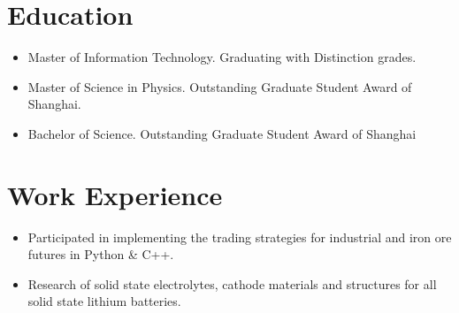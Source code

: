 \documentclass{resume}
\begin{document}
  

\section{Education}
\begin{itemize}
\item Master of Information Technology. Graduating with Distinction grades.
\end{itemize}

\begin{itemize}
\item  Master of Science in Physics. Outstanding Graduate Student Award of Shanghai.
\end{itemize}

\begin{itemize}
\item Bachelor of Science. Outstanding Graduate Student Award of Shanghai 
\end{itemize}


\section{Work Experience}
\begin{itemize}
  \item Participated in implementing the trading strategies for industrial and iron ore futures in Python \& C++.
\end{itemize}

\begin{itemize}
  \item Research of solid state electrolytes, cathode materials and structures for all solid state lithium batteries.
\end{itemize}
\end{document}
